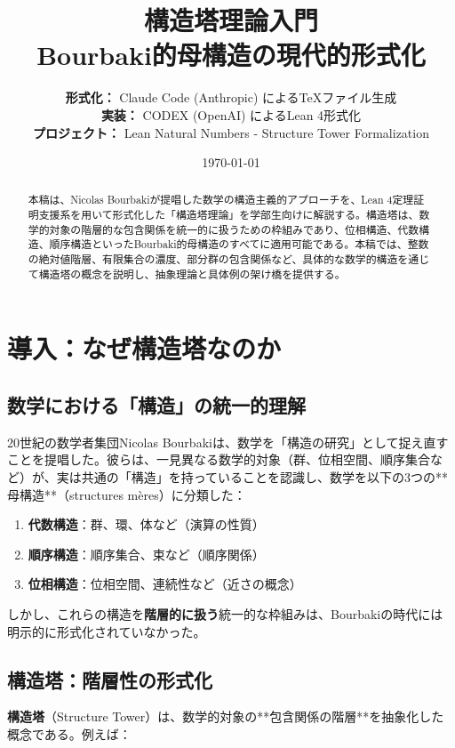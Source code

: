 \documentclass[a4paper,11pt]{ltjsarticle}
\title{\Huge \textbf{構造塔理論入門} \\[0.5em]
\Large Bourbaki的母構造の現代的形式化}
\author{
\textbf{形式化：} Claude Code (Anthropic) によるTeXファイル生成 \\[0.3em]
\textbf{実装：} CODEX (OpenAI) によるLean 4形式化 \\[0.3em]
\textbf{プロジェクト：} Lean Natural Numbers - Structure Tower Formalization
}
\date{\today}
\begin{document}
\maketitle

\begin{abstract}
本稿は、Nicolas Bourbakiが提唱した数学の構造主義的アプローチを、Lean 4定理証明支援系を用いて形式化した「構造塔理論」を学部生向けに解説する。構造塔は、数学的対象の階層的な包含関係を統一的に扱うための枠組みであり、位相構造、代数構造、順序構造といったBourbaki的母構造のすべてに適用可能である。本稿では、整数の絶対値階層、有限集合の濃度、部分群の包含関係など、具体的な数学的構造を通じて構造塔の概念を説明し、抽象理論と具体例の架け橋を提供する。
\end{abstract}

\tableofcontents
\newpage

\section{導入：なぜ構造塔なのか}

\subsection{数学における「構造」の統一的理解}

20世紀の数学者集団Nicolas Bourbakiは、数学を「構造の研究」として捉え直すことを提唱した。彼らは、一見異なる数学的対象（群、位相空間、順序集合など）が、実は共通の「構造」を持っていることを認識し、数学を以下の3つの**母構造**（structures mères）に分類した：

\begin{enumerate}
\item \textbf{代数構造}：群、環、体など（演算の性質）
\item \textbf{順序構造}：順序集合、束など（順序関係）
\item \textbf{位相構造}：位相空間、連続性など（近さの概念）
\end{enumerate}

しかし、これらの構造を\textbf{階層的に扱う}統一的な枠組みは、Bourbakiの時代には明示的に形式化されていなかった。

\subsection{構造塔：階層性の形式化}

\textbf{構造塔}（Structure Tower）は、数学的対象の**包含関係の階層**を抽象化した概念である。例えば：
\end{document}
